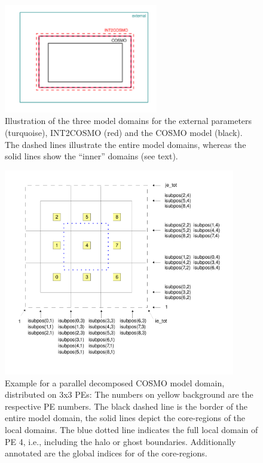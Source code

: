 \documentclass[11pt,twoside]{article}
\begin{document}
\begin{figure}
\begin{center} 
\includegraphics[width=0.6\textwidth]{MMDUM_ext_i2c_c_grids.pdf} 
\end{center} 
\vspace{-.8cm}
\caption{Illustration of the three model domains for the external parameters 
(turquoise), INT2COSMO (red) and the COSMO model (black). The dashed lines 
illustrate the entire model domains, whereas the solid lines show the
 ``inner'' domains (see text).} 
\label{fig:domains} 
\end{figure} 
\begin{figure}
\begin{center} 
\vspace{-1.3cm}
\includegraphics[width=0.9\textwidth]{MMDUM_halo_a.pdf} 
\end{center} 
\vspace{-.8cm}
\caption{Example for a parallel decomposed COSMO model domain, distributed on
3x3 PEs: The numbers on yellow background are the respective PE 
numbers. The black dashed line is the border of the entire model domain, 
the solid lines depict the core-regions of the local domains. The blue dotted 
line indicates the full local domain of PE 4, i.e., including the halo or
ghost boundaries. Additionally annotated are the global indices for
of the core-regions.} 
\label{fig:decomp_globidx} 
\end{figure} 
\end{document}
